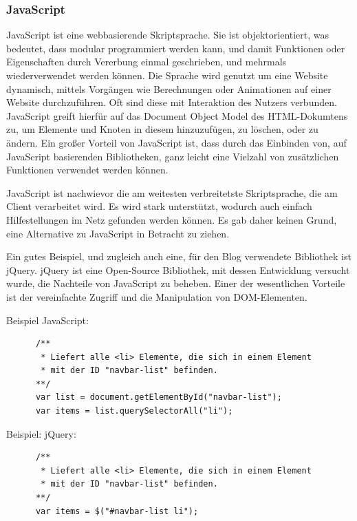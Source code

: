       \subsubsection*{JavaScript}
      {JavaScript\cite{javascript}} ist eine webbasierende Skriptsprache. Sie ist objektorientiert, was bedeutet, dass modular programmiert werden kann, und damit Funktionen oder Eigenschaften
      durch Vererbung einmal geschrieben, und mehrmals wiederverwendet werden können. Die Sprache wird genutzt um eine Website dynamisch, mittels Vorgängen wie Berechnungen oder Animationen auf einer Website durchzuführen.
      Oft sind diese mit Interaktion des Nutzers verbunden. JavaScript greift hierfür auf das Document Object Model des HTML-Dokumtens zu, um Elemente und Knoten in diesem hinzuzufügen, zu löschen, oder
      zu ändern. Ein großer Vorteil von JavaScript ist, dass durch das Einbinden von, auf JavaScript basierenden Bibliotheken, ganz leicht eine Vielzahl von zusätzlichen Funktionen
      verwendet werden können.

      JavaScript ist nachwievor die am weitesten verbreitetste Skriptsprache, die am Client verarbeitet wird. Es wird stark unterstützt, wodurch auch einfach Hilfestellungen im Netz
      gefunden werden können. Es gab daher keinen Grund, eine Alternative zu JavaScript in Betracht zu ziehen.

      Ein gutes Beispiel, und zugleich auch eine, für den Blog verwendete Bibliothek ist {jQuery\cite{jquery}}.
      jQuery ist eine Open-Source Bibliothek, mit dessen Entwicklung versucht wurde, die Nachteile von JavaScript zu beheben. Einer der wesentlichen Vorteile ist
      der vereinfachte Zugriff und die Manipulation von DOM-Elementen.

      Beispiel JavaScript:

      \lstset{language=html}
    	\begin{lstlisting}
      /**
       * Liefert alle <li> Elemente, die sich in einem Element
       * mit der ID "navbar-list" befinden.
      **/
      var list = document.getElementById("navbar-list");
      var items = list.querySelectorAll("li");
      \end{lstlisting}

      Beispiel: jQuery:

      \lstset{language=html}
    	\begin{lstlisting}
      /**
       * Liefert alle <li> Elemente, die sich in einem Element
       * mit der ID "navbar-list" befinden.
      **/
      var items = $("#navbar-list li");
    	\end{lstlisting}

